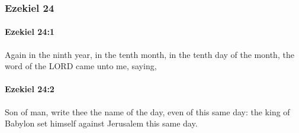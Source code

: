	\subsubsection{Ezekiel 24} %
		\label{EZEKIEL-24}

		\paragraph{Ezekiel 24:1} %
			\label{EZEKIEL-24-1}

			Again in the ninth year, in the tenth month, in the tenth day of the month, the word of the LORD came unto me, saying,


		\paragraph{Ezekiel 24:2} %
			\label{EZEKIEL-24-2}

			Son of man, write thee the name of the day, even of this same day: the king of Babylon set himself against Jerusalem this same day.

